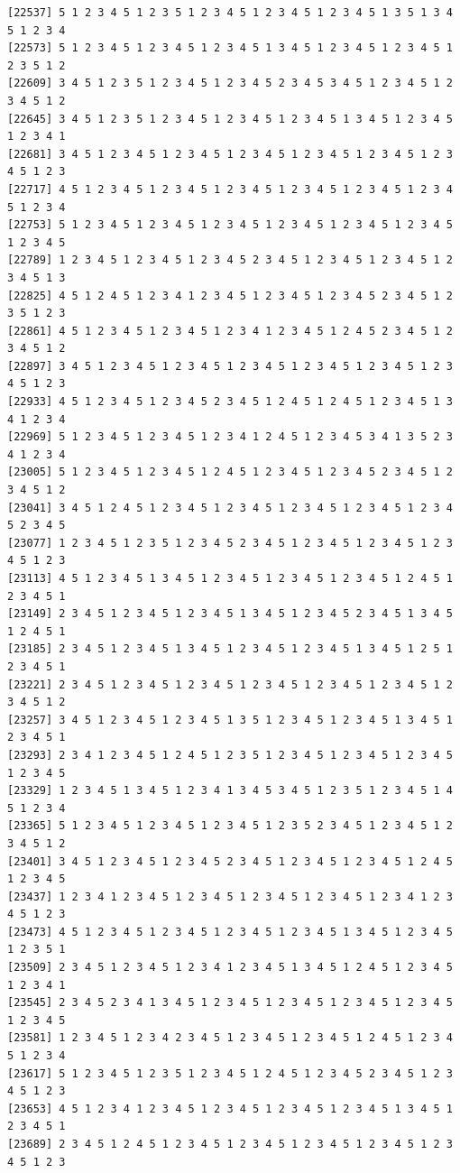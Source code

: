 \documentclass[
  11pt,
]{book}
\begin{document}
\begin{verbatim}
[22537] 5 1 2 3 4 5 1 2 3 5 1 2 3 4 5 1 2 3 4 5 1 2 3 4 5 1 3 5 1 3 4 5 1 2 3 4
[22573] 5 1 2 3 4 5 1 2 3 4 5 1 2 3 4 5 1 3 4 5 1 2 3 4 5 1 2 3 4 5 1 2 3 5 1 2
[22609] 3 4 5 1 2 3 5 1 2 3 4 5 1 2 3 4 5 2 3 4 5 3 4 5 1 2 3 4 5 1 2 3 4 5 1 2
[22645] 3 4 5 1 2 3 5 1 2 3 4 5 1 2 3 4 5 1 2 3 4 5 1 3 4 5 1 2 3 4 5 1 2 3 4 1
[22681] 3 4 5 1 2 3 4 5 1 2 3 4 5 1 2 3 4 5 1 2 3 4 5 1 2 3 4 5 1 2 3 4 5 1 2 3
[22717] 4 5 1 2 3 4 5 1 2 3 4 5 1 2 3 4 5 1 2 3 4 5 1 2 3 4 5 1 2 3 4 5 1 2 3 4
[22753] 5 1 2 3 4 5 1 2 3 4 5 1 2 3 4 5 1 2 3 4 5 1 2 3 4 5 1 2 3 4 5 1 2 3 4 5
[22789] 1 2 3 4 5 1 2 3 4 5 1 2 3 4 5 2 3 4 5 1 2 3 4 5 1 2 3 4 5 1 2 3 4 5 1 3
[22825] 4 5 1 2 4 5 1 2 3 4 1 2 3 4 5 1 2 3 4 5 1 2 3 4 5 2 3 4 5 1 2 3 5 1 2 3
[22861] 4 5 1 2 3 4 5 1 2 3 4 5 1 2 3 4 1 2 3 4 5 1 2 4 5 2 3 4 5 1 2 3 4 5 1 2
[22897] 3 4 5 1 2 3 4 5 1 2 3 4 5 1 2 3 4 5 1 2 3 4 5 1 2 3 4 5 1 2 3 4 5 1 2 3
[22933] 4 5 1 2 3 4 5 1 2 3 4 5 2 3 4 5 1 2 4 5 1 2 4 5 1 2 3 4 5 1 3 4 1 2 3 4
[22969] 5 1 2 3 4 5 1 2 3 4 5 1 2 3 4 1 2 4 5 1 2 3 4 5 3 4 1 3 5 2 3 4 1 2 3 4
[23005] 5 1 2 3 4 5 1 2 3 4 5 1 2 4 5 1 2 3 4 5 1 2 3 4 5 2 3 4 5 1 2 3 4 5 1 2
[23041] 3 4 5 1 2 4 5 1 2 3 4 5 1 2 3 4 5 1 2 3 4 5 1 2 3 4 5 1 2 3 4 5 2 3 4 5
[23077] 1 2 3 4 5 1 2 3 5 1 2 3 4 5 2 3 4 5 1 2 3 4 5 1 2 3 4 5 1 2 3 4 5 1 2 3
[23113] 4 5 1 2 3 4 5 1 3 4 5 1 2 3 4 5 1 2 3 4 5 1 2 3 4 5 1 2 4 5 1 2 3 4 5 1
[23149] 2 3 4 5 1 2 3 4 5 1 2 3 4 5 1 3 4 5 1 2 3 4 5 2 3 4 5 1 3 4 5 1 2 4 5 1
[23185] 2 3 4 5 1 2 3 4 5 1 3 4 5 1 2 3 4 5 1 2 3 4 5 1 3 4 5 1 2 5 1 2 3 4 5 1
[23221] 2 3 4 5 1 2 3 4 5 1 2 3 4 5 1 2 3 4 5 1 2 3 4 5 1 2 3 4 5 1 2 3 4 5 1 2
[23257] 3 4 5 1 2 3 4 5 1 2 3 4 5 1 3 5 1 2 3 4 5 1 2 3 4 5 1 3 4 5 1 2 3 4 5 1
[23293] 2 3 4 1 2 3 4 5 1 2 4 5 1 2 3 5 1 2 3 4 5 1 2 3 4 5 1 2 3 4 5 1 2 3 4 5
[23329] 1 2 3 4 5 1 3 4 5 1 2 3 4 1 3 4 5 3 4 5 1 2 3 5 1 2 3 4 5 1 4 5 1 2 3 4
[23365] 5 1 2 3 4 5 1 2 3 4 5 1 2 3 4 5 1 2 3 5 2 3 4 5 1 2 3 4 5 1 2 3 4 5 1 2
[23401] 3 4 5 1 2 3 4 5 1 2 3 4 5 2 3 4 5 1 2 3 4 5 1 2 3 4 5 1 2 4 5 1 2 3 4 5
[23437] 1 2 3 4 1 2 3 4 5 1 2 3 4 5 1 2 3 4 5 1 2 3 4 5 1 2 3 4 1 2 3 4 5 1 2 3
[23473] 4 5 1 2 3 4 5 1 2 3 4 5 1 2 3 4 5 1 2 3 4 5 1 3 4 5 1 2 3 4 5 1 2 3 5 1
[23509] 2 3 4 5 1 2 3 4 5 1 2 3 4 1 2 3 4 5 1 3 4 5 1 2 4 5 1 2 3 4 5 1 2 3 4 1
[23545] 2 3 4 5 2 3 4 1 3 4 5 1 2 3 4 5 1 2 3 4 5 1 2 3 4 5 1 2 3 4 5 1 2 3 4 5
[23581] 1 2 3 4 5 1 2 3 4 2 3 4 5 1 2 3 4 5 1 2 3 4 5 1 2 4 5 1 2 3 4 5 1 2 3 4
[23617] 5 1 2 3 4 5 1 2 3 5 1 2 3 4 5 1 2 4 5 1 2 3 4 5 2 3 4 5 1 2 3 4 5 1 2 3
[23653] 4 5 1 2 3 4 1 2 3 4 5 1 2 3 4 5 1 2 3 4 5 1 2 3 4 5 1 3 4 5 1 2 3 4 5 1
[23689] 2 3 4 5 1 2 4 5 1 2 3 4 5 1 2 3 4 5 1 2 3 4 5 1 2 3 4 5 1 2 3 4 5 1 2 3

\end{verbatim}
\end{document}

